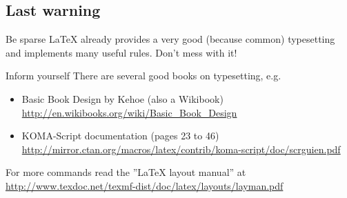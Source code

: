 \subsection{Last warning}
\begin{frame}
	\begin{block}{Be sparse}
		\LaTeX{} already provides a very good (because common) typesetting and
		implements many useful rules. {\color{red}Don't mess with it!}
	\end{block}

	\begin{block}{Inform yourself}
		There are several good books on typesetting, e.g. 
		\begin{itemize}
			\item Basic Book Design by Kehoe (also a Wikibook)\\
				\url{http://en.wikibooks.org/wiki/Basic_Book_Design}
			\item KOMA-Script documentation (pages 23 to 46)\\
				\url{http://mirror.ctan.org/macros/latex/contrib/koma-script/doc/scrguien.pdf}
		\end{itemize}
	\end{block}

For more commands read the ''{\LaTeX} layout manual'' at
\url{http://www.texdoc.net/texmf-dist/doc/latex/layouts/layman.pdf}

\end{frame}
